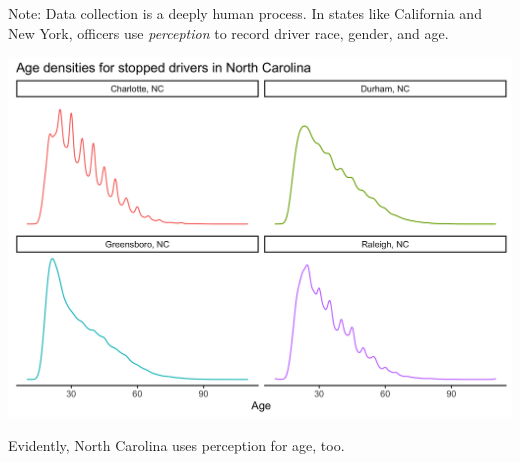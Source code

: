\documentclass[11pt]{beamer}
\begin{document}
\begin{frame}{Note: Data collection is a deeply human process.}
	In states like California and New York, officers use \emph{perception} to record driver race, gender, and age. 
	\begin{center}
	\includegraphics[scale=0.1]{fig/nc_age.png}
	\end{center}
	Evidently, North Carolina uses perception for age, too. 
\end{frame}

\end{document}
